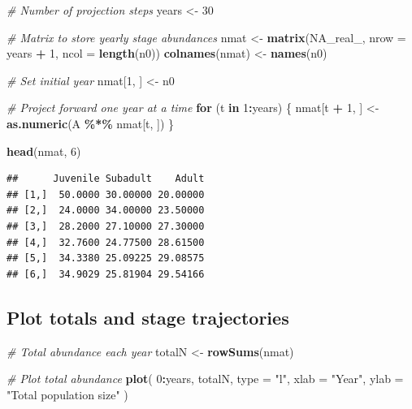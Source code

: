 \documentclass[
  a4paper]{book}
\newenvironment{Shaded}{\begin{snugshade}}{\end{snugshade}}
\newcommand{\AttributeTok}[1]{\textcolor[rgb]{0.13,0.29,0.53}{#1}}
\newcommand{\CommentTok}[1]{\textcolor[rgb]{0.56,0.35,0.01}{\textit{#1}}}
\newcommand{\ConstantTok}[1]{\textcolor[rgb]{0.56,0.35,0.01}{#1}}
\newcommand{\ControlFlowTok}[1]{\textcolor[rgb]{0.13,0.29,0.53}{\textbf{#1}}}
\newcommand{\DecValTok}[1]{\textcolor[rgb]{0.00,0.00,0.81}{#1}}
\newcommand{\FunctionTok}[1]{\textcolor[rgb]{0.13,0.29,0.53}{\textbf{#1}}}
\newcommand{\NormalTok}[1]{#1}
\newcommand{\OtherTok}[1]{\textcolor[rgb]{0.56,0.35,0.01}{#1}}
\newcommand{\SpecialCharTok}[1]{\textcolor[rgb]{0.81,0.36,0.00}{\textbf{#1}}}
\newcommand{\StringTok}[1]{\textcolor[rgb]{0.31,0.60,0.02}{#1}}
\begin{document}
\begin{Shaded}
\begin{Highlighting}[]
\CommentTok{\# Number of projection steps}
\NormalTok{years }\OtherTok{\textless{}{-}} \DecValTok{30}

\CommentTok{\# Matrix to store yearly stage abundances}
\NormalTok{nmat }\OtherTok{\textless{}{-}} \FunctionTok{matrix}\NormalTok{(}\ConstantTok{NA\_real\_}\NormalTok{, }\AttributeTok{nrow =}\NormalTok{ years }\SpecialCharTok{+} \DecValTok{1}\NormalTok{, }\AttributeTok{ncol =} \FunctionTok{length}\NormalTok{(n0))}
\FunctionTok{colnames}\NormalTok{(nmat) }\OtherTok{\textless{}{-}} \FunctionTok{names}\NormalTok{(n0)}

\CommentTok{\# Set initial year}
\NormalTok{nmat[}\DecValTok{1}\NormalTok{, ] }\OtherTok{\textless{}{-}}\NormalTok{ n0}

\CommentTok{\# Project forward one year at a time}
\ControlFlowTok{for}\NormalTok{ (t }\ControlFlowTok{in} \DecValTok{1}\SpecialCharTok{:}\NormalTok{years) \{}
\NormalTok{  nmat[t }\SpecialCharTok{+} \DecValTok{1}\NormalTok{, ] }\OtherTok{\textless{}{-}} \FunctionTok{as.numeric}\NormalTok{(A }\SpecialCharTok{\%*\%}\NormalTok{ nmat[t, ])}
\NormalTok{\}}

\FunctionTok{head}\NormalTok{(nmat, }\DecValTok{6}\NormalTok{)}
\end{Highlighting}
\end{Shaded}

\begin{verbatim}
##      Juvenile Subadult    Adult
## [1,]  50.0000 30.00000 20.00000
## [2,]  24.0000 34.00000 23.50000
## [3,]  28.2000 27.10000 27.30000
## [4,]  32.7600 24.77500 28.61500
## [5,]  34.3380 25.09225 29.08575
## [6,]  34.9029 25.81904 29.54166
\end{verbatim}

\subsection{Plot totals and stage trajectories}\label{plot-totals-and-stage-trajectories}

\begin{Shaded}
\begin{Highlighting}[]
\CommentTok{\# Total abundance each year}
\NormalTok{totalN }\OtherTok{\textless{}{-}} \FunctionTok{rowSums}\NormalTok{(nmat)}

\CommentTok{\# Plot total abundance}
\FunctionTok{plot}\NormalTok{(}
  \DecValTok{0}\SpecialCharTok{:}\NormalTok{years, totalN, }\AttributeTok{type =} \StringTok{"l"}\NormalTok{,}
  \AttributeTok{xlab =} \StringTok{"Year"}\NormalTok{, }\AttributeTok{ylab =} \StringTok{"Total population size"}
\NormalTok{)}
\end{Highlighting}
\end{Shaded}
\end{document}
